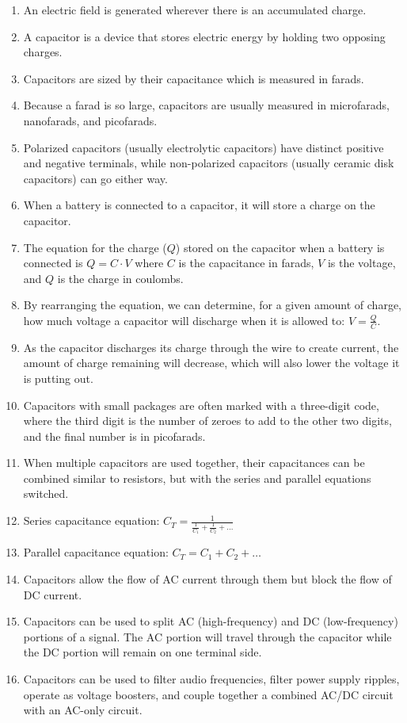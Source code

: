 \begin{enumerate}
\item An electric field is generated wherever there is an accumulated charge.
\item A capacitor is a device that stores electric energy by holding two opposing charges.
\item Capacitors are sized by their capacitance which is measured in farads.
\item Because a farad is so large, capacitors are usually measured in microfarads, nanofarads, and picofarads.
\item Polarized capacitors (usually electrolytic capacitors) have distinct positive and negative terminals, while non-polarized capacitors (usually ceramic disk capacitors) can go either way.
\item When a battery is connected to a capacitor, it will store a charge on the capacitor.
\item The equation for the charge ($Q$) stored on the capacitor when a battery is connected is $Q = C\cdot V$ where $C$ is the capacitance in farads, $V$ is the voltage, and $Q$ is the charge in coulombs.
\item By rearranging the equation, we can determine, for a given amount of charge, how much voltage a capacitor will discharge when it is allowed to: $V = \frac{Q}{C}$.
\item As the capacitor discharges its charge through the wire to create current, the amount of charge remaining will decrease, which will also lower the voltage it is putting out.
\item Capacitors with small packages are often marked with a three-digit code, where the third digit is the number of zeroes to add to the other two digits, and the final number is in picofarads.
\item When multiple capacitors are used together, their capacitances can be combined similar to resistors, but with the series and parallel equations switched.
\item Series capacitance equation: $C_T = \frac{1}{\frac{1}{C_1} + \frac{1}{C_2} + \ldots}$
\item Parallel capacitance equation: $C_T = C_1 + C_2 + \ldots$
\item Capacitors allow the flow of AC current through them but block the flow of DC current.
\item Capacitors can be used to split AC (high-frequency) and DC (low-frequency) portions of a signal.  The AC portion will travel through the capacitor while the DC portion will remain on one terminal side.
\item Capacitors can be used to filter audio frequencies, filter power supply ripples, operate as voltage boosters, and couple together a combined AC/DC circuit with an AC-only circuit.
\end{enumerate}

